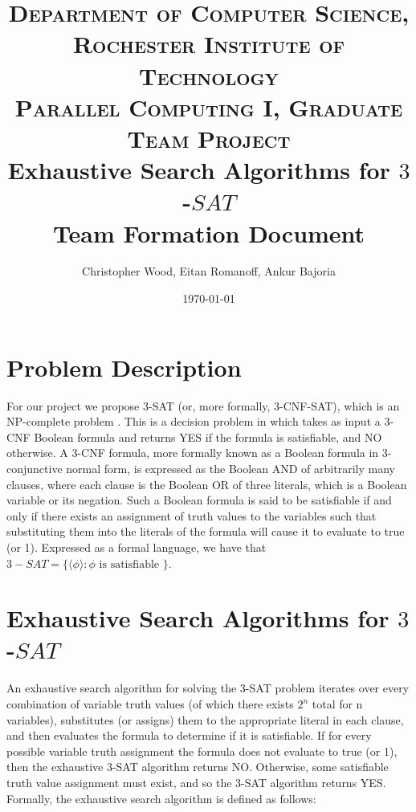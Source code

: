\documentclass[paper=a4, fontsize=10pt]{scrartcl} %
\title{	
\normalfont \normalsize 
\textsc{Department of Computer Science, Rochester Institute of Technology} \\ %
\textsc{Parallel Computing I, Graduate Team Project} 
\horrule{2pt} \\[0.4cm] %
\huge Exhaustive Search Algorithms for $3$-$SAT$ \\ 
\Large Team Formation Document \\
\horrule{2pt}
}
\author{Christopher Wood, Eitan Romanoff, Ankur Bajoria } %
\date{\large \today} %
\begin{document}
\maketitle %

\section{Problem Description}
For our project we propose 3-SAT (or, more formally, 3-CNF-SAT), which 
is an NP-complete problem \cite{algs}. This is a decision problem in which takes 
as input a 3-CNF Boolean formula and returns YES if the formula is 
satisfiable, and NO otherwise. A 3-CNF formula, more formally known 
as a Boolean formula in 3-conjunctive normal form, is expressed as the 
Boolean AND of arbitrarily many clauses, where each clause is the Boolean 
OR of three literals, which is a Boolean variable or its negation. Such a 
Boolean formula is said to be satisfiable if and only if there exists an 
assignment of truth values to the variables such that substituting them 
into the literals of the formula will cause it to evaluate to true (or 1). 
Expressed as a formal language, we have that $3-SAT = \{\langle \phi \rangle : \phi \text{ is satisfiable } \}$.

\section{Exhaustive Search Algorithms for $3$-$SAT$}
An exhaustive search algorithm for solving the 3-SAT problem iterates over 
every combination of variable truth values (of which there exists $2^n$ total 
for n variables), substitutes (or assigns) them to the appropriate literal in each 
clause, and then evaluates the formula to determine if it is satisfiable. If for 
every possible variable truth assignment the formula does not evaluate to 
true (or 1), then the exhaustive 3-SAT algorithm returns NO. Otherwise, 
some satisfiable truth value assignment must exist, and so the 3-SAT algorithm 
returns YES. Formally, the exhaustive search algorithm is defined as follows:
\end{document}
